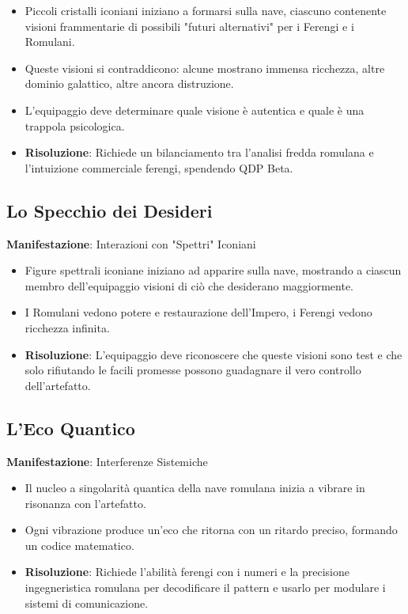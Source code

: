 \documentclass[letterpaper,twocolumn,openany,nodeprecatedcode]{dndbook}
\begin{document}
\begin{itemize}
    \item Piccoli cristalli iconiani iniziano a formarsi sulla nave, ciascuno contenente visioni frammentarie di possibili "futuri alternativi" per i Ferengi e i Romulani.
    \item Queste visioni si contraddicono: alcune mostrano immensa ricchezza, altre dominio galattico, altre ancora distruzione.
    \item L'equipaggio deve determinare quale visione è autentica e quale è una trappola psicologica.
    \item \textbf{Risoluzione}: Richiede un bilanciamento tra l'analisi fredda romulana e l'intuizione commerciale ferengi, spendendo QDP Beta.
\end{itemize}

\subsection{Lo Specchio dei Desideri}
\textbf{Manifestazione}: Interazioni con "Spettri" Iconiani

\begin{itemize}
    \item Figure spettrali iconiane iniziano ad apparire sulla nave, mostrando a ciascun membro dell'equipaggio visioni di ciò che desiderano maggiormente.
    \item I Romulani vedono potere e restaurazione dell'Impero, i Ferengi vedono ricchezza infinita.
    \item \textbf{Risoluzione}: L'equipaggio deve riconoscere che queste visioni sono test e che solo rifiutando le facili promesse possono guadagnare il vero controllo dell'artefatto.
\end{itemize}

\subsection{L'Eco Quantico}
\textbf{Manifestazione}: Interferenze Sistemiche

\begin{itemize}
    \item Il nucleo a singolarità quantica della nave romulana inizia a vibrare in risonanza con l'artefatto.
    \item Ogni vibrazione produce un'eco che ritorna con un ritardo preciso, formando un codice matematico.
    \item \textbf{Risoluzione}: Richiede l'abilità ferengi con i numeri e la precisione ingegneristica romulana per decodificare il pattern e usarlo per modulare i sistemi di comunicazione.
\end{itemize}
\end{document}
